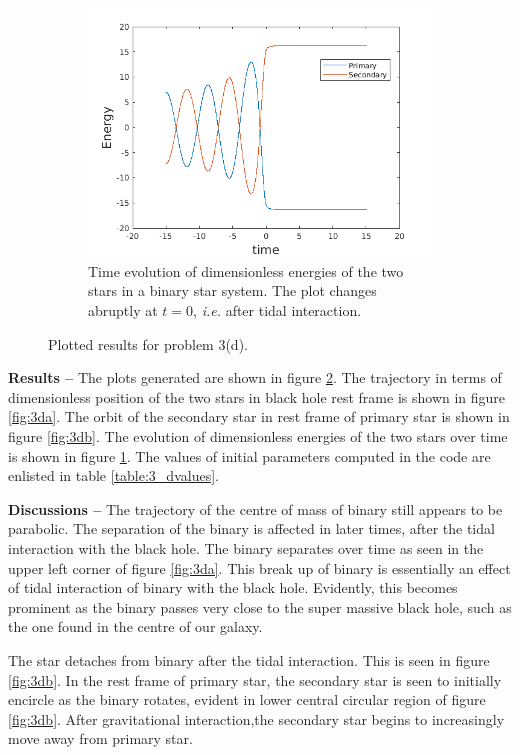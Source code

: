 \documentclass[a4paper]{article}
\begin{document}
\begin{enumerate} [label*=\textbf{(\alph*)}]
\begin{figure} [h]
						\begin{subfigure} {\columnwidth}
							\centering
							\includegraphics[width=.5\columnwidth]{../plots/3d_energy.png}
							\caption{Time evolution of dimensionless energies of the two stars in a binary star system. The plot changes abruptly at \(t=0\), \textit{i.e.} after tidal interaction.}
							\label{fig:3dc}
						\end{subfigure}
						\caption{Plotted results for problem 3(d).}
						\label{fig:3.2}
					\end{figure}
					
					\subitem \textbf{Results  --} 
					The plots generated are shown in figure \ref{fig:3.2}. The trajectory in terms of dimensionless position of the two stars in black hole rest frame is shown in figure \ref{fig:3da}. The orbit of the secondary star in rest frame of primary star is shown in figure \ref{fig:3db}. The evolution of dimensionless energies of the two stars over time is shown in figure \ref{fig:3dc}. The values of initial parameters computed in the code are enlisted in table \ref{table:3_dvalues}.
					
					\subitem \textbf{Discussions  --}
					The trajectory of the centre of mass of binary still appears to be parabolic. The separation of the binary is affected in later times, after the tidal interaction with the black hole. The binary separates over time as seen in the upper left corner of figure \ref{fig:3da}. This break up of binary is essentially an effect of tidal interaction of binary with the black hole. Evidently, this becomes prominent as the binary passes very close to the super massive black hole, such as the one found in the centre of our galaxy.
					
					The star detaches from binary after the tidal interaction. This is seen in figure \ref{fig:3db}. In the rest frame of primary star, the secondary star is seen to initially encircle as the binary rotates, evident in lower central circular region of figure \ref{fig:3db}. After gravitational interaction,the secondary star begins to increasingly move away from primary star.
					

\end{enumerate}
\end{document}
